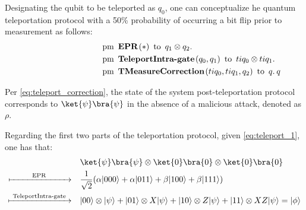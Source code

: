  Designating the qubit to be teleported as $q_0$, one can conceptualize he quantum teleportation protocol with a 50\% probability of occurring a bit flip prior to measurement as follows:
 \begin{align*}
     \hspace{90pt}& \text{pm} \hspace{5pt} \textbf{EPR}\hspace{1pt} (*) \hspace{5pt} \text{to} \hspace{5pt}  q_{1} \otimes q_{2}.  \notag \\
     & \text{pm}\hspace{5pt} \textbf{TeleportIntra-gate} \hspace{1pt} (q_0,q_{1}) \hspace{5pt}  \text{to} \hspace{5pt} tiq_{0}\otimes tiq_{1} . \notag \\
     & \text{pm} \hspace{5pt}  \textbf{TMeasureCorrection} \hspace{1pt} ( tiq_{0},  tiq_{1}, q_{2} ) \hspace{5pt} \text{to} \hspace{5pt}  q. \hspace{2pt}  q
 \end{align*}
 
 Per \autoref{eq:teleport_correction}, the state of the system post-teleportation protocol corresponds to $\ket{\psi}\bra{\psi}$ in the absence of a malicious attack, denoted as $\rho$.

 Regarding the first two  parts of the teleportation protocol, given \autoref{eq:teleport_1}, one has that:
\begin{equation} \label{eq:teleport_T_part1}
  \begin{split}
  &\ket{\psi} \bra{\psi} \otimes \ket{0} \bra{0} \otimes \ket{0} \bra{0} \\
  \xmapsto{ \hspace{26pt} \text{EPR} \hspace{27pt} } \quad &  \frac{1}{\sqrt{2}} (\alpha|000\rangle + \alpha|011\rangle + \beta|100\rangle + \beta|111\rangle)\\
  \xmapsto{ \hspace{3pt} \text{TeleportIntra-gate} \hspace{3pt} } \quad & |00\rangle \otimes |\psi\rangle  + |01\rangle \otimes X|\psi\rangle + |10\rangle \otimes Z |\psi\rangle + |11\rangle \otimes XZ|\psi\rangle = |\phi\rangle  \\
  \end{split}
\end{equation}

